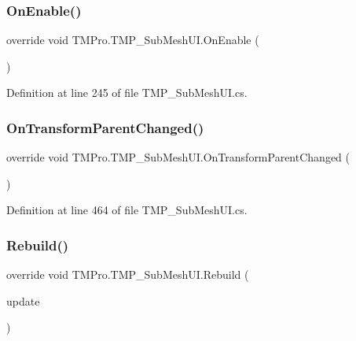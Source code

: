 \subsubsection{\texorpdfstring{OnEnable()}{OnEnable()}}
{\footnotesize\ttfamily override void T\+M\+Pro.\+T\+M\+P\+\_\+\+Sub\+Mesh\+U\+I.\+On\+Enable (\begin{DoxyParamCaption}{ }\end{DoxyParamCaption})\hspace{0.3cm}{\ttfamily [protected]}}







Definition at line 245 of file T\+M\+P\+\_\+\+Sub\+Mesh\+U\+I.\+cs.

\mbox{\label{class_t_m_pro_1_1_t_m_p___sub_mesh_u_i_a37e6c09ce69b4b53a9245571c981f41c}} 
\subsubsection{\texorpdfstring{OnTransformParentChanged()}{OnTransformParentChanged()}}
{\footnotesize\ttfamily override void T\+M\+Pro.\+T\+M\+P\+\_\+\+Sub\+Mesh\+U\+I.\+On\+Transform\+Parent\+Changed (\begin{DoxyParamCaption}{ }\end{DoxyParamCaption})\hspace{0.3cm}{\ttfamily [protected]}}







Definition at line 464 of file T\+M\+P\+\_\+\+Sub\+Mesh\+U\+I.\+cs.

\mbox{\label{class_t_m_pro_1_1_t_m_p___sub_mesh_u_i_aa1918700dd7e78768075a88b31db98a2}} 
\subsubsection{\texorpdfstring{Rebuild()}{Rebuild()}}
{\footnotesize\ttfamily override void T\+M\+Pro.\+T\+M\+P\+\_\+\+Sub\+Mesh\+U\+I.\+Rebuild (\begin{DoxyParamCaption}\item[{Canvas\+Update}]{update }\end{DoxyParamCaption})}







